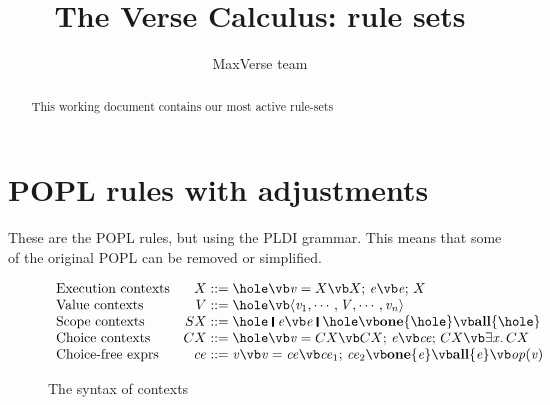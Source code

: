 \documentclass[acmsmall,review,dvipsnames,nocopyrightspace]{acmart}
\newcommand{\Conid}[1]{\mathit{#1}}
\newcommand{\Varid}[1]{\mathit{#1}}
\newif\iffullverse
\begin{document}
\title{The Verse Calculus: rule sets}

\author{MaxVerse team}


\begin{abstract}
This working document contains our most active rule-sets
\end{abstract}


\maketitle

\section{POPL rules with adjustments}
These are the POPL rules, but using the PLDI grammar.
This means that some of the original POPL can be removed or simplified.

\figureSyntax

\begin{figure}
  $$
    \begin{array}{lr@{\;}c@{\;}l}
    \text{Execution contexts} & X & ::= & \hole \vb \ensuremath{\Varid{v}=X} \vb \ensuremath{X;\,\Varid{e}} \vb \ensuremath{\Varid{e};\,X} \\
    \text{Value contexts} & V & ::= & \hole \vb \ensuremath{\langle{}\Varid{v}_{\mathrm{1}},\cdots,\Conid{V},\cdots,\Varid{v}_{\Varid{n}}\rangle}\\
    \text{Scope contexts} & SX & ::= & \ensuremath{\hole\;\rule[-0.3mm]{0.5mm}{2.5mm}\;\Varid{e}} \vb \ensuremath{\Varid{e}\;\rule[-0.3mm]{0.5mm}{2.5mm}\;\hole}
    \vb \ensuremath{\textbf{one}\{\hole\}} \vb \ensuremath{\textbf{all}\{\hole\}} \\
\iffullverse
    && \vb & \ensuremath{\textbf{succeeds}\,\{\hole\}} \vb \ensuremath{\textbf{decides}\,\{\hole\}} \\
\fi
    \text{Choice contexts} & CX & ::= & \hole \vb \ensuremath{\Varid{v}=CX} \vb \ensuremath{CX;\,\Varid{e}} \vb \ensuremath{\Varid{ce};\,CX} \vb \ensuremath{\exists\Varid{x}.\,CX} \\
    \text{Choice-free exprs} & ce  & ::=  & \ensuremath{\Varid{v}} \vb \ensuremath{\Varid{v}=\Varid{ce}} \vb \ensuremath{\Varid{ce}_{\mathrm{1}};\,\Varid{ce}_{\mathrm{2}}}
    \vb \ensuremath{\textbf{one}\{\Varid{e}\}} \vb \ensuremath{\textbf{all}\{\Varid{e}\}}
    \vb \ensuremath{\Varid{op}(\Varid{v})}
  \end{array}
   $$
  \caption{The syntax of contexts}
    \label{fig:contexts}
\end{figure}
\end{document}
